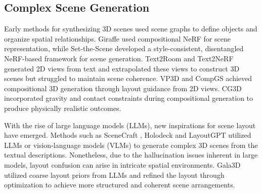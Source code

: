 \subsection{Complex Scene Generation}
Early methods \cite{chang2014learning} for synthesizing 3D scenes used scene graphs to define objects and organize spatial relationships. Giraffe \cite{niemeyer2021giraffe} used compositional NeRF for scene representation, while Set-the-Scene \cite{cohen2023set} developed a style-consistent, disentangled NeRF-based framework for scene generation. Text2Room \cite{hollein2023text2room} and Text2NeRF \cite{zhang2024text2nerf} generated 2D views from text and extrapolated these views to construct 3D scenes but struggled to maintain scene coherence. VP3D \cite{chen2024vp3d} and CompGS \cite{ge2024compgs} achieved compositional 3D generation through layout guidance from 2D views. CG3D \cite{vilesov2023cg3d} incorporated gravity and contact constraints during compositional generation to produce physically realistic outcomes. 

With the rise of large language models (LLMs), new inspirations for scene layout have emerged. Methods such as SceneCraft \cite{kumaran2023scenecraft}, Holodeck \cite{yang2024holodeck} and LayoutGPT \cite{feng2024layoutgpt} utilized LLMs or vision-language models (VLMs) to generate complex 3D scenes from the textual descriptions. Nonetheless, due to the hallucination issues inherent in large models, layout confusion can arise in intricate spatial environments. Gala3D \cite{zhou2024gala3d} utilized coarse layout priors from LLMs and refined the layout through optimization to achieve more structured and coherent scene arrangements. 
